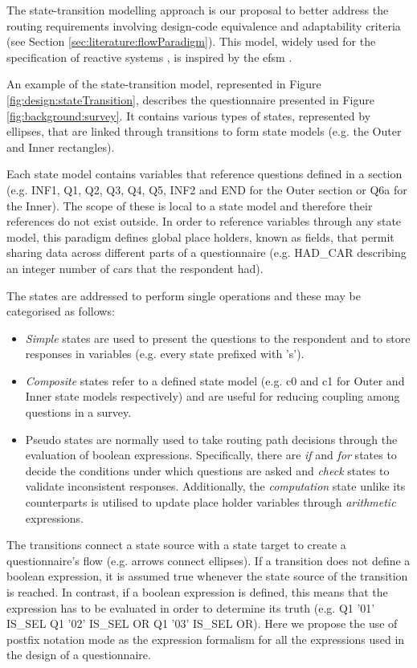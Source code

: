	The state-transition modelling approach is our proposal to better address the routing requirements involving design-code equivalence and adaptability criteria (see Section \ref{sec:literature:flowParadigm}). This model, widely used for the specification of reactive systems \cite{tech:androutsopoulos08}, is inspired by the \gls{efsm} \cite{book:alagar11}.

	An example of the state-transition model, represented in Figure \ref{fig:design:stateTransition}, describes the questionnaire presented in Figure \ref{fig:background:survey}. It contains various types of states, represented by ellipses, that are linked through transitions to form state models (e.g. the Outer and Inner rectangles). 

	Each state model contains variables that reference questions defined in a section (e.g. INF1, Q1, Q2, Q3, Q4, Q5, INF2 and END for the Outer section or Q6a for the Inner). The scope of these is local to a state model and therefore their references do not exist outside. In order to reference variables through any state model, this paradigm defines global place holders, known as fields, that permit sharing data across different parts of a questionnaire (e.g. HAD\_CAR describing an integer number of cars that the respondent had).

	The states are addressed to perform single operations and these may be categorised as follows:

	\begin{itemize}
		\item \emph{Simple} states are used to present the questions to the respondent and to store responses in variables (e.g. every state prefixed with 's').
		\item \emph{Composite} states refer to a defined state model (e.g. c0 and c1 for Outer and Inner state models respectively) and are useful for reducing coupling among questions in a survey.
		\item Pseudo states are normally used to take routing path decisions through the evaluation of boolean expressions. Specifically, there are \emph{if} and \emph{for} states to decide the conditions under which questions are asked and \emph{check} states to validate inconsistent responses. Additionally, the \emph{computation} state unlike its counterparts is utilised to update place holder variables through \emph{arithmetic} expressions.
	\end{itemize}

	The transitions connect a state source with a state target to create a questionnaire's flow (e.g. arrows connect ellipses). If a transition does not define a boolean expression, it is assumed true whenever the state source of the transition is reached. In contrast, if a boolean expression is defined, this means that the expression has to be evaluated in order to determine its truth (e.g. Q1 '01' IS\_SEL Q1 '02' IS\_SEL OR Q1 '03' IS\_SEL OR). Here we propose the use of postfix notation mode as the expression formalism for all the expressions used in the design of a questionnaire.

